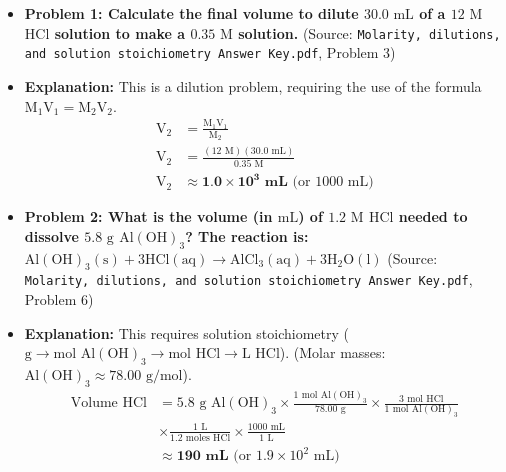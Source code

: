 \documentclass{article}
\begin{document}
\begin{itemize}
    \item \textbf{Problem 1: Calculate the final volume to dilute $30.0 \text{ mL}$ of a $12 \text{ M}$ $\text{HCl}$ solution to make a $0.35 \text{ M}$ solution.} (Source: \texttt{Molarity, dilutions, and solution stoichiometry Answer Key.pdf}, Problem 3)

    \item \textbf{Explanation:} This is a dilution problem, requiring the use of the formula $\text{M}_1\text{V}_1 = \text{M}_2\text{V}_2$.
    \begin{align*}
        \text{V}_2 &= \frac{\text{M}_1\text{V}_1}{\text{M}_2} \\
        \text{V}_2 &= \frac{(12 \text{ M})(30.0 \text{ mL})}{0.35 \text{ M}} \\
        \text{V}_2 &\approx \textbf{1.0} \times \mathbf{10^3 \text{ mL}} \text{ (or } 1000 \text{ mL)}
    \end{align*}

    \item \textbf{Problem 2: What is the volume (in $\text{mL}$) of $1.2 \text{ M}$ $\text{HCl}$ needed to dissolve $5.8 \text{ g}$ $\text{Al}(\text{OH})_3$? The reaction is: $\text{Al}(\text{OH})_3(\text{s}) + 3\text{HCl}(\text{aq}) \rightarrow \text{AlCl}_3(\text{aq}) + 3\text{H}_2\text{O}(\text{l})$} (Source: \texttt{Molarity, dilutions, and solution stoichiometry Answer Key.pdf}, Problem 6)

    \item \textbf{Explanation:} This requires solution stoichiometry ($\text{g} \rightarrow \text{mol } \text{Al}(\text{OH})_3 \rightarrow \text{mol } \text{HCl} \rightarrow \text{L } \text{HCl}$). (Molar masses: $\text{Al}(\text{OH})_3 \approx 78.00 \text{ g/mol}$).
    \begin{align*}
        \text{Volume HCl} &= 5.8 \text{ g } \text{Al}(\text{OH})_3 \times \frac{1 \text{ mol } \text{Al}(\text{OH})_3}{78.00 \text{ g}} \times \frac{3 \text{ mol } \text{HCl}}{1 \text{ mol } \text{Al}(\text{OH})_3} \\
        &\times \frac{1 \text{ L}}{1.2 \text{ moles } \text{HCl}} \times \frac{1000 \text{ mL}}{1 \text{ L}} \\
        &\approx \textbf{190 mL} \text{ (or } 1.9 \times 10^2 \text{ mL)}
    \end{align*}
\end{itemize}

\bigskip %
\end{document}
